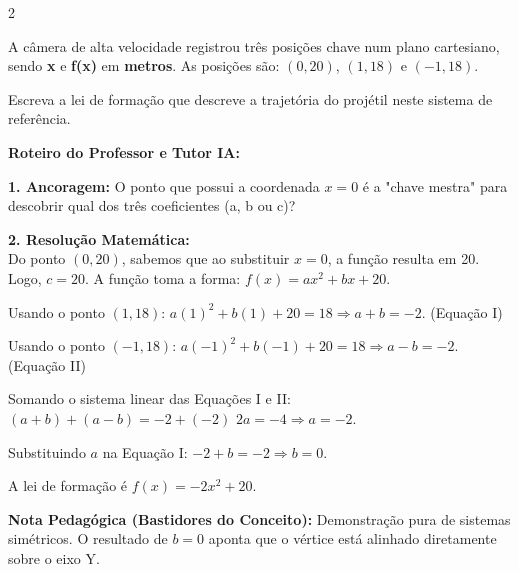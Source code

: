 \begin{multicols*}{2}
\begin{enunciadoLiteral}
A câmera de alta velocidade registrou três posições chave num plano cartesiano, sendo \textbf{x} e \textbf{f(x)} em \textbf{metros}. As posições são: $(0, 20)$, $(1, 18)$ e $(-1, 18)$. 

Escreva a lei de formação que descreve a trajetória do projétil neste sistema de referência.
\end{enunciadoLiteral}

\ifgabarito
    \begin{tcolorbox}[colback=CorTitUm!5, colframe=CorTitUm, boxrule=1pt, arc=4pt, left=6pt, right=6pt, top=6pt, bottom=6pt]
    \small\textbf{\textcolor{CorTitUm}{Roteiro do Professor e Tutor IA:}}\par\vspace{0.1cm}
    \color{CinzaEscuro}
    \textbf{1. Ancoragem:} O ponto que possui a coordenada $x=0$ é a "chave mestra" para descobrir qual dos três coeficientes (a, b ou c)?\par\vspace{0.1cm}
    \textbf{2. Resolução Matemática:}\\
    Do ponto $(0, 20)$, sabemos que ao substituir $x=0$, a função resulta em 20. Logo, $c = 20$. A função toma a forma: $f(x) = ax^2 + bx + 20$.
    
    Usando o ponto $(1, 18)$: 
    $a(1)^2 + b(1) + 20 = 18 \Rightarrow a + b = -2$. (Equação I)
    
    Usando o ponto $(-1, 18)$: 
    $a(-1)^2 + b(-1) + 20 = 18 \Rightarrow a - b = -2$. (Equação II)
    
    Somando o sistema linear das Equações I e II:
    $(a + b) + (a - b) = -2 + (-2)$
    $2a = -4 \Rightarrow a = -2$.
    
    Substituindo $a$ na Equação I:
    $-2 + b = -2 \Rightarrow b = 0$.
    
    A lei de formação é $f(x) = -2x^2 + 20$.
    \end{tcolorbox}
    \vspace{0.15cm}
    
    \begin{boxexplicacao}
    \textbf{Nota Pedagógica (Bastidores do Conceito):} Demonstração pura de sistemas simétricos. O resultado de $b=0$ aponta que o vértice está alinhado diretamente sobre o eixo Y.
    \end{boxexplicacao}
\fi

\par\vspace{\espacoQuestao}

\end{multicols*}
